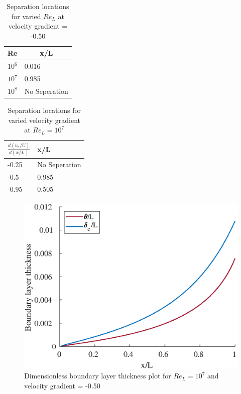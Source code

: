


\begin{table}[H]
\centering
\begin{tabular}{l|l}
\hline
Re                    & \multicolumn{1}{c}{x/L} \\ \hline
$10^6$ & 0.016                   \\
$10^7$ & 0.985                   \\
$10^8$ & No Seperation                       \\ \hline
\end{tabular}
\caption{Separation locations for varied $Re_L$ at velocity gradient = -0.50}
\end{table}

\begin{table}[H]
\centering
\begin{tabular}{l|l}
\hline
$\frac{d(u_e/U)}{d(x/L)}$ & x/L   \\ \hline
-0.25 & No Seperation     \\
-0.5  & 0.985 \\
-0.95 & 0.505 \\ \hline
\end{tabular}
\caption{Separation locations for varied velocity gradient at $Re_L = 10^7$}
\end{table}

\begin{figure}[H]
\centering
\includegraphics[scale=0.8]{graphs/e5g1.eps}
\caption{Dimensionless boundary layer thickness plot for $Re_L = 10^7$ and velocity gradient = -0.50 }
\label{e1g1}
\end{figure}

